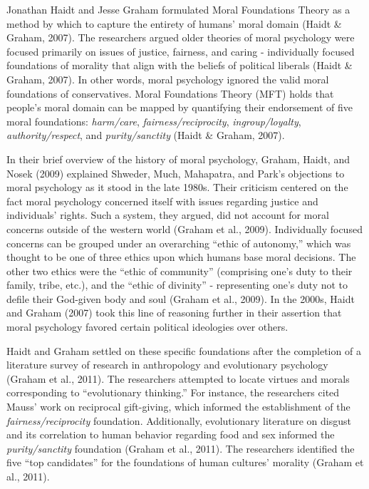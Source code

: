 \documentclass[english,,man]{apa6}
\begin{document}
Jonathan Haidt and Jesse Graham formulated Moral Foundations Theory as a
method by which to capture the entirety of humans' moral domain (Haidt
\& Graham, 2007). The researchers argued older theories of moral
psychology were focused primarily on issues of justice, fairness, and
caring - individually focused foundations of morality that align with
the beliefs of political liberals (Haidt \& Graham, 2007). In other
words, moral psychology ignored the valid moral foundations of
conservatives. Moral Foundations Theory (MFT) holds that people's moral
domain can be mapped by quantifying their endorsement of five moral
foundations: \emph{harm/care}, \emph{fairness/reciprocity},
\emph{ingroup/loyalty}, \emph{authority/respect}, and
\emph{purity/sanctity} (Haidt \& Graham, 2007).

In their brief overview of the history of moral psychology, Graham,
Haidt, and Nosek (2009) explained Shweder, Much, Mahapatra, and Park's
objections to moral psychology as it stood in the late 1980s. Their
criticism centered on the fact moral psychology concerned itself with
issues regarding justice and individuals' rights. Such a system, they
argued, did not account for moral concerns outside of the western world
(Graham et al., 2009). Individually focused concerns can be grouped
under an overarching \enquote{ethic of autonomy,} which was thought to
be one of three ethics upon which humans base moral decisions. The other
two ethics were the \enquote{ethic of community} (comprising one's duty
to their family, tribe, etc.), and the \enquote{ethic of divinity} -
representing one's duty not to defile their God-given body and soul
(Graham et al., 2009). In the 2000s, Haidt and Graham (2007) took this
line of reasoning further in their assertion that moral psychology
favored certain political ideologies over others.

Haidt and Graham settled on these specific foundations after the
completion of a literature survey of research in anthropology and
evolutionary psychology (Graham et al., 2011). The researchers attempted
to locate virtues and morals corresponding to \enquote{evolutionary
thinking.} For instance, the researchers cited Mauss' work on reciprocal
gift-giving, which informed the establishment of the
\emph{fairness/reciprocity} foundation. Additionally, evolutionary
literature on disgust and its correlation to human behavior regarding
food and sex informed the \emph{purity/sanctity} foundation (Graham et
al., 2011). The researchers identified the five \enquote{top candidates}
for the foundations of human cultures' morality (Graham et al., 2011).
\end{document}
